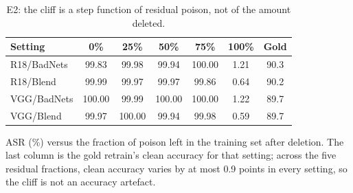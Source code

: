 \begin{table}[t]
\centering
\caption{E2: the cliff is a step function of residual poison, not of the amount deleted.}
\label{tab:residual}
\footnotesize
\setlength{\tabcolsep}{4.5pt}
\begin{tabular}{lcccccc}
\toprule
\textbf{Setting} & \textbf{0\%} & \textbf{25\%} & \textbf{50\%} & \textbf{75\%} & \textbf{100\%} & \textbf{Gold} \\
\midrule
R18/BadNets & 99.83 & 99.98 & 99.94 & 100.00 & 1.21 & 90.3 \\
R18/Blend & 99.99 & 99.97 & 99.97 & 99.86 & 0.64 & 90.2 \\
VGG/BadNets & 100.00 & 99.99 & 100.00 & 100.00 & 1.22 & 89.7 \\
VGG/Blend & 99.97 & 100.00 & 99.94 & 99.98 & 0.59 & 89.7 \\
\bottomrule
\end{tabular}
\par\vspace{1pt}\footnotesize\raggedright ASR (\%) versus the fraction of poison left in the training set after deletion. The last column is the gold retrain's clean accuracy for that setting; across the five residual fractions, clean accuracy varies by at most 0.9 points in every setting, so the cliff is not an accuracy artefact.
\end{table}
